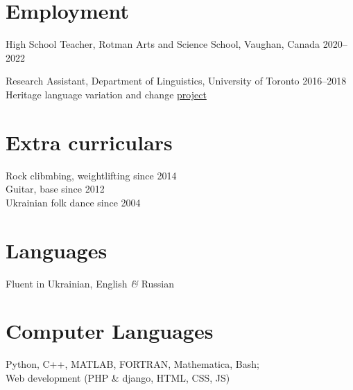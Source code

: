 \documentclass[margin,line]{res}
\begin{document}
\begin{resume}
\section{\sc Employment}
High School Teacher, Rotman Arts and Science School, Vaughan, Canada \hfill{2020--2022}

\vspace*{-2mm}

Research Assistant, Department of Linguistics, University of Toronto \hfill{2016--2018}\\
Heritage language variation and change \href{https://ngn.artsci.utoronto.ca/HLVC/0_0_home.php}{project}

\section{\sc Extra curriculars}

Rock clibmbing, weightlifting \hfill{since 2014}\\
Guitar, base \hfill{since 2012}\\
Ukrainian folk dance \hfill{since 2004}


\section{\sc Languages}

Fluent in Ukrainian, English \textit{\&} Russian
\section{\sc Computer Languages}

Python, C++, MATLAB, FORTRAN, Mathematica, Bash;\\
Web development (PHP \& django, HTML, CSS, JS)
\end{resume}
\end{document}
